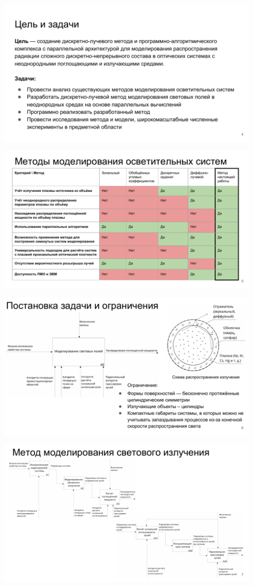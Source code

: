 \includegraphics[angle=90,origin=c]{inc/img/presentation-4}

\includegraphics[angle=90,origin=c]{inc/img/presentation-5}

\includegraphics[angle=90,origin=c]{inc/img/presentation-6}

\includegraphics[angle=90,origin=c]{inc/img/presentation-7}

